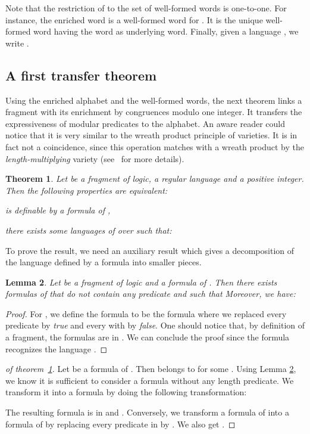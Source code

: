 \documentclass[submission,hidelink]{dmtcs-episciences}
\newtheorem{theorem}{Theorem}
\newtheorem{lemma}[theorem]{Lemma}
\newenvironment{conditions}
{\begin{list}{\rm (\theenumi)}{\noindent \usecounter{enumi}\setlength{\topsep}{2pt}\setlength{\partopsep}{0pt}\setlength{\itemsep}{2pt}\setlength{\parsep}{0pt}\setlength{\leftmargin}{2.5em}\setlength{\labelwidth}{1.5em}\setlength{\labelsep}{0.5em}\setlength{\listparindent}{0pt}\setlength{\itemindent}{0pt}}}{\end{list}}
\begin{document}
		Note that the restriction of  to the set of well-formed words is one-to-one.
		For instance, the enriched word  is a well-formed word for .
		It is the unique well-formed word having the word
	 as underlying word. Finally, given a language , we write .

\subsection{A first transfer theorem}
Using the enriched alphabet and the well-formed words, the next theorem links a fragment with its enrichment by congruences modulo one integer.
It transfers the expressiveness of modular predicates to the alphabet.
An aware reader could notice that it is very similar to the wreath product principle of varieties. It is in fact not a coincidence, since
this operation matches with a wreath product by the \emph{length-multiplying} variety  (see~\cite{CPS06b} for more details).
\begin{theorem}\label{semimod}
			Let  be a fragment of logic,
			 a regular language and  a positive integer.
			Then the following properties are equivalent:
			\begin{conditions}
				\item\label{thmsemimod:1}  is definable by a formula of ,

				\item\label{thmsemimod:3} there exists
				      some languages  of
				       over  such that:
			\end{conditions}
\end{theorem}
		To prove the result,
 		we need an auxiliary result which gives a decomposition of the language defined by a formula into smaller pieces.

	\begin{lemma}\label{formNorm}
	Let  be a fragment of logic and  a formula of .
	Then there exists  formulas  of  that do not contain any predicate 
	and such that 
	Moreover, we have:  
	\end{lemma}
	\begin{proof}
	For , we define the formula  to be the formula  where we replaced
		every predicate  by \emph{true} and every  with  by \emph{false}.
		One should notice that, by definition of a fragment, the formulas
		 are in .
		We can conclude the proof since the formula 
		recognizes the language .
	\end{proof}


		\begin{proof}[of theorem~\ref{semimod}]
		Let  be a formula of . Then  belongs to  for some .
		Using Lemma \ref{formNorm}, we know it is sufficient to consider a formula
		 without any length predicate.
		We transform it into a formula  by doing the following transformation:
		
		The resulting formula
		 is in  and .
		Conversely, we transform a formula  of  into a formula  of  by
		replacing every predicate  in  by .
		We also get .
	\end{proof}
\end{document}
